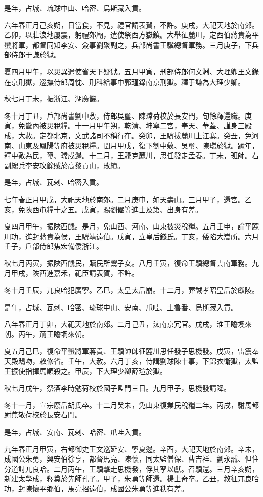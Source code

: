 \begin{pinyinscope}
是年，占城、琉球中山、哈密、烏斯藏入貢。

六年春正月己亥朔，日當食，不見，禮官請表賀，不許。庚戌，大祀天地於南郊。乙卯，以莊浪地屢震，躬禮郊廟，遣使祭西方嶽鎮。大舉征麓川，定西伯蔣貴為平蠻將軍，都督同知李安、僉事劉聚副之，兵部尚書王驥總督軍務。三月庚子，下兵部侍郎于謙於獄。

夏四月甲午，以災異遣使省天下疑獄。五月甲寅，刑部侍郎何文淵、大理卿王文錄在京刑獄，巡撫侍郎周忱、刑科給事中郭瑾錄南京刑獄。釋于謙為大理少卿。

秋七月丁未，振浙江、湖廣饑。

冬十月丁丑，戶部尚書劉中敷，侍郎吳璽、陳瑺荷校於長安門，旬餘釋還職。庚寅，免畿內被災稅糧。十一月甲午朔，乾清、坤寧二宮，奉天、華蓋、謹身三殿成，大赦。定都北京，文武諸司不稱行在。癸卯，王驥拔麓川上江寨。癸丑，免河南、山東及鳳陽等府被災稅糧。閏月甲戌，復下劉中敷、吳璽、陳瑺於獄。踰年，釋中敷為民，璽、瑺戍邊。十二月，王驥克麓川，思任發走孟養。丁未，班師。右副總兵李安攻餘賊於高黎貢山，敗績。

是年，占城、瓦剌、哈密入貢。

七年春正月甲戌，大祀天地於南郊。二月庚申，如天壽山。三月甲子，還宮。乙亥，免陜西屯糧十之五。戊寅，賜劉儼等進士及第、出身有差。

夏四月甲午，振陜西饑。是月，免山西、河南、山東被災稅糧。五月壬申，論平麓川功，進封蔣貴為侯，王驥靖遠伯。戊寅，立皇后錢氏。丁亥，倭陷大嵩所。六月壬子，戶部侍郎焦宏備倭浙江。

秋七月丙寅，振陜西饑民，贖民所鬻子女。八月壬寅，復命王驥總督雲南軍務。九月甲戌，陜西進嘉禾，祀臣請表賀，不許。

冬十月壬辰，兀良哈犯廣寧。乙巳，太皇太后崩。十二月，葬誠孝昭皇后於獻陵。

是年，占城、瓦剌、哈密、琉球中山、安南、爪哇、土魯番、烏斯藏入貢。

八年春正月丁卯，大祀天地於南郊。二月己丑，汰南京冗官。戊戌，淮王瞻墺來朝。丙午，荊王瞻堈來朝。

夏五月己巳，復命平蠻將軍蔣貴、王驥帥師征麓川思任發子思機發。戊寅，雷震奉天殿鴟吻，敕修省。壬午，大赦。六月丁亥，侍講劉球陳十事，下錦衣衛獄，太監王振使指揮馬順殺之。甲辰，下大理少卿薛瑄於獄。

秋七月戊午，祭酒李時勉荷校於國子監門三日。九月甲子，思機發請降。

冬十一月，宣宗廢后胡氏卒。十二月癸未，免山東復業民稅糧二年。丙戌，駙馬都尉焦敬荷校於長安右門。

是年，占城、安南、瓦剌、哈密、爪哇入貢。

九年春正月甲寅，右都御史王文巡延安、寧夏邊。辛酉，大祀天地於南郊。辛未，成國公朱勇，興安伯徐亨，都督馬亮、陳懷，同太監僧保、曹吉祥、劉永誠、但住分道討兀良哈。二月丙午，王驥擊走思機發，俘其孥以獻。召驥還。三月辛亥朔，新建太學成，釋奠於先師孔子。甲子，朱勇等師還。楊士奇卒。乙丑，敘征兀良哈功，封陳懷平鄉伯，馬亮招遠伯，成國公朱勇等進秩有差。


\end{pinyinscope}
